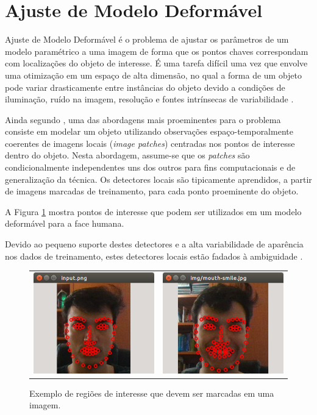 \section{Ajuste de Modelo Deformável}

Ajuste de Modelo Deformável é o problema de ajustar os parâmetros de um modelo
paramétrico a uma imagem de forma que os pontos chaves correspondam com
localizações do objeto de interesse. É uma tarefa difícil uma vez que envolve
uma otimização em um espaço de alta dimensão, no qual a forma de um objeto pode
variar drasticamente entre instâncias do objeto devido a condições de
iluminação, ruído na imagem, resolução e fontes intrínsecas de variabilidade
\cite{saragih2011deformable}.

Ainda segundo \cite{saragih2011deformable}, uma das abordagens mais proeminentes
para o problema consiste em modelar um objeto utilizando observações
espaço-temporalmente coerentes de imagens locais (\textit{image patches})
centradas nos pontos de interesse dentro do objeto. Nesta abordagem, assume-se
que os \textit{patches} são condicionalmente independentes uns dos outros para
fins computacionais e de generalização da técnica. Os detectores locais são
tipicamente aprendidos, a partir de imagens marcadas de treinamento, para cada
ponto proeminente do objeto.

A Figura \ref{fig:pontos-de-interesse} mostra pontos de interesse que podem ser
utilizados em um modelo deformável para a face humana.

Devido ao pequeno suporte destes detectores e a alta variabilidade de aparência
nos dados de treinamento, estes detectores locais estão fadados à ambiguidade
\cite{saragih2011deformable}. 

\begin{figure}[!htb]
   \centering
\begin{tabular}{cc}
\includegraphics[width=0.4\linewidth]{./figs/sample-detection.png}&
\includegraphics[width=0.4\linewidth]{./figs/sample-detection-2.png}
\end{tabular}
    \caption{Exemplo de regiões de interesse que devem ser marcadas em uma imagem.}
    \label{fig:pontos-de-interesse}
\end{figure}

